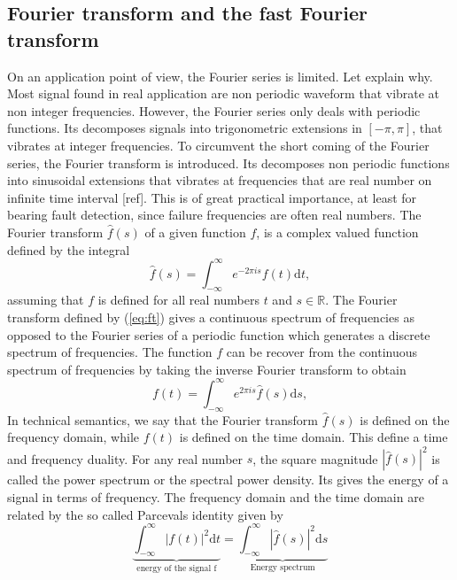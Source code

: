 \documentclass[../Main/thesis.tex]{subfiles}
\begin{document}
\subsection{Fourier transform and the fast Fourier transform}
On an application point of view, the Fourier series is limited. Let explain why. Most signal found in real application are non periodic waveform that vibrate at non integer frequencies. However, the Fourier series only deals with periodic functions. Its decomposes signals into trigonometric extensions in $[-\pi, \pi]$, that vibrates at integer frequencies. To circumvent the short coming of the Fourier series, the Fourier transform is introduced. Its decomposes non periodic functions into sinusoidal extensions that vibrates at frequencies that are real number on infinite time interval [ref]. This is of great practical importance, at least for bearing fault detection, since failure frequencies are often real numbers.
\justify
The Fourier transform $\hat{f}(s)$ of a given function $f$, is a complex valued function defined by the integral
\begin{equation}\label{eq:ft}
   \hat{f}(s) = \int_{-\infty}^{\infty}e^{-2\pi i s}f(t)\mathrm{d}t,
\end{equation}
assuming that $f$ is defined for all real numbers $t$ and $s\in\mathbb{R}$. The Fourier transform defined by (\ref{eq:ft}) gives a continuous spectrum of frequencies as opposed to the Fourier series of a periodic function which generates a discrete spectrum of frequencies. The function $f$ can be recover from the continuous spectrum of frequencies by taking the inverse Fourier transform to obtain
\begin{equation}\label{eq:ift}
f(t) = \int_{-\infty}^{\infty}e^{2\pi i s}\hat{f}(s)\mathrm{d}s,
\end{equation}
In technical semantics, we say that the Fourier transform $\hat{f}(s)$ is defined on the frequency domain, while $f(t)$ is defined on the time domain. This define a time and frequency duality. For any real number $s$, the square magnitude $|\hat{f}(s)|^{2}$ is called the power spectrum or the spectral power density. Its gives the energy of a signal in terms of frequency. The frequency domain and the time domain are related by the so called Parcevals identity
given by 
\begin{equation}\label{eq:parceval}
\underbrace{\int_{-\infty}^{\infty}|f(t)|^{2}\mathrm{d}t}_{\text{energy of the signal f}} = \underbrace{\int_{-\infty}^{\infty}|\hat{f}(s)|^{2}\mathrm{d}s}_{\text{Energy spectrum}}
\end{equation}
\end{document}
